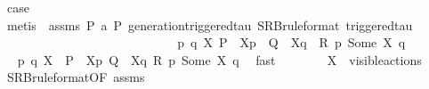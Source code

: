 \begin{isabellebody}
\ {\isacharquery}{\kern0pt}case\isanewline
\ \ \ \ \ \ \ \ \ \ \isamarkupfalse%
\ {\isacharparenleft}{\kern0pt}metis\ {\isachardoublequoteopen}{}{\isachardoublequoteclose}{\isacharparenleft}{\kern0pt}{}{\isacharparenright}{\kern0pt}\ assms{\isacharparenleft}{\kern0pt}{}{\isacharparenright}{\kern0pt}\ {\isacartoucheopen}P\ {\isasymlongmapsto}\isactrlsup {\isasymtheta}a\ P{\isacharprime}{\kern0pt}{\isacartoucheclose}\ generation{\isacharunderscore}{\kern0pt}triggered{\isacharunderscore}{\kern0pt}tau\ SRB{\isacharunderscore}{\kern0pt}ruleformat{\isacharparenleft}{\kern0pt}{}{\isacharparenright}{\kern0pt}\ triggered{\isacharunderscore}{\kern0pt}tau{\isacharparenright}{\kern0pt}\isanewline
\ \ \ \ \ \ \isamarkupfalse%
\isanewline
\ \ \ \ \isanewline
\ \ \ \ \isamarkupfalse%
\isanewline
\ \ \ \ \isanewline
\ \ \ \ \ \ \isamarkupfalse%
\ {\isacartoucheopen}{\isasymexists}p\ q\ X{\isachardot}{\kern0pt}\ P\ {\isacharequal}{\kern0pt}\ {\isasymtheta}{\isacharbrackleft}{\kern0pt}X{\isacharbrackright}{\kern0pt}{\isacharparenleft}{\kern0pt}p{\isacharparenright}{\kern0pt}\ {\isasymand}\ Q\ {\isacharequal}{\kern0pt}\ {\isasymtheta}{\isacharbrackleft}{\kern0pt}X{\isacharbrackright}{\kern0pt}{\isacharparenleft}{\kern0pt}q{\isacharparenright}{\kern0pt}\ {\isasymand}\ R\ p\ {\isacharparenleft}{\kern0pt}Some\ X{\isacharparenright}{\kern0pt}\ q{\isacartoucheclose}\isanewline
\ \ \ \ \ \ \isamarkupfalse%
\ \isamarkupfalse%
\ p\ q\ X\ \ {\isacartoucheopen}P\ {\isacharequal}{\kern0pt}\ {\isasymtheta}{\isacharbrackleft}{\kern0pt}X{\isacharbrackright}{\kern0pt}{\isacharparenleft}{\kern0pt}p{\isacharparenright}{\kern0pt}{\isacartoucheclose}\ {\isacartoucheopen}Q\ {\isacharequal}{\kern0pt}\ {\isasymtheta}{\isacharbrackleft}{\kern0pt}X{\isacharbrackright}{\kern0pt}{\isacharparenleft}{\kern0pt}q{\isacharparenright}{\kern0pt}{\isacartoucheclose}\ {\isacartoucheopen}R\ p\ {\isacharparenleft}{\kern0pt}Some\ X{\isacharparenright}{\kern0pt}\ q{\isacartoucheclose}\ \isamarkupfalse%
\ fast\isanewline
\ \ \ \ \ \ \isamarkupfalse%
\ {\isacartoucheopen}X\ {\isasymsubseteq}\ visible{\isacharunderscore}{\kern0pt}actions{\isacartoucheclose}\ \isamarkupfalse%
\ SRB{\isacharunderscore}{\kern0pt}ruleformat{\isacharparenleft}{\kern0pt}{}{\isacharparenright}{\kern0pt}{\isacharbrackleft}{\kern0pt}OF\ assms{\isacharparenleft}{\kern0pt}{}{\isacharparenright}{\kern0pt}{\isacharbrackright}{\kern0pt}\ \isamarkupfalse%

\end{isabellebody}
